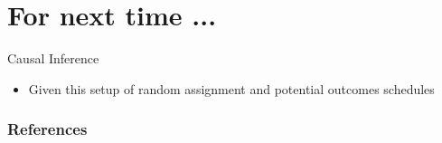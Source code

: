 \documentclass[table, xcolor = {dvipsnames}, 9pt]{beamer}
\theoremstyle{plain}
\newcommand{\mh}[1]{{\color{magenta}{#1}}}
\begin{document}
\section{For next time ... }
\begin{frame}{Causal Inference}
\vfill
\begin{itemize} \vfill
\item Given this setup of random assignment and potential outcomes schedules \vfill
\begin{center}
\mh{What statistical tools can we use to assess evidence against No Discrimination and in favor of Perfect Discrimination (or vice versa)?}
\end{center}
\vfill
\end{itemize} \vfill
\end{frame}

\begin{frame}
\frametitle{References} 
\scriptsize

\end{frame}
\end{document}
